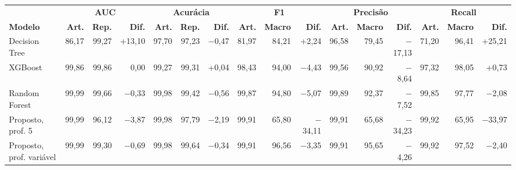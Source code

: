 \begin{tabular}{lrrrrrrrrrrrrrrr}
\hline
\multicolumn{1}{c}{\textbf{}} & \multicolumn{3}{c}{\textbf{AUC}} & \multicolumn{3}{c}{\textbf{Acurácia}} & \multicolumn{3}{c}{\textbf{F1}} & \multicolumn{3}{c}{\textbf{Precisão}} & \multicolumn{3}{c}{\textbf{Recall}} \\
\textbf{Modelo} & \textbf{Art.} & \textbf{Rep.} & \textbf{Dif.} & \textbf{Art.} & \textbf{Rep.} & \textbf{Dif.} & \textbf{Art.} & \textbf{Macro} & \textbf{Dif.} & \textbf{Art.} & \textbf{Macro} & \textbf{Dif.} & \textbf{Art.} & \textbf{Macro} & \textbf{Dif.} \\ \hline
Decision Tree & 86,17 & 99,27 & +13,10 & 97,70 & 97,23 & $-$0,47 & 81,97 & 84,21 & +2,24 & 96,58 & 79,45 & $-$17,13 & 71,20 & 96,41 & +25,21 \\
XGBoost & 99,86 & 99,86 & 0,00 & 99,27 & 99,31 & +0,04 & 98,43 & 94,00 & $-$4,43 & 99,56 & 90,92 & $-$8,64 & 97,32 & 98,05 & +0,73 \\
Random Forest & 99,99 & 99,66 & $-$0,33 & 99,98 & 99,42 & $-$0,56 & 99,87 & 94,80 & $-$5,07 & 99,89 & 92,37 & $-$7,52 & 99,85 & 97,77 & $-$2,08 \\
Proposto, prof. 5 & 99,99 & 96,12 & $-$3,87 & 99,98 & 97,79 & $-$2,19 & 99,91 & 65,80 & $-$34,11 & 99,91 & 65,68 & $-$34,23 & 99,92 & 65,95 & $-$33,97 \\
Proposto, prof. variável & 99,99 & 99,30 & $-$0,69 & 99,98 & 99,64 & $-$0,34 & 99,91 & 96,56 & $-$3,35 & 99,91 & 95,65 & $-$4,26 & 99,92 & 97,52 & $-$2,40 \\
\hline
\end{tabular}
